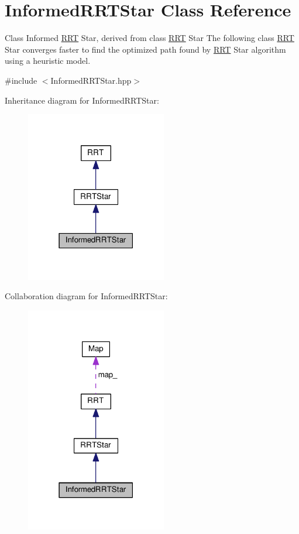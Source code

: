 \hypertarget{classInformedRRTStar}{}\section{Informed\+R\+R\+T\+Star Class Reference}
\label{classInformedRRTStar}


Class Informed \hyperlink{classRRT}{R\+RT} Star, derived from class \hyperlink{classRRT}{R\+RT} Star The following class \hyperlink{classRRT}{R\+RT} Star converges faster to find the optimized path found by \hyperlink{classRRT}{R\+RT} Star algorithm using a heuristic model.  




{\ttfamily \#include $<$Informed\+R\+R\+T\+Star.\+hpp$>$}



Inheritance diagram for Informed\+R\+R\+T\+Star\+:
\nopagebreak
\begin{figure}[H]
\begin{center}
\leavevmode
\includegraphics[width=174pt]{classInformedRRTStar__inherit__graph}
\end{center}
\end{figure}


Collaboration diagram for Informed\+R\+R\+T\+Star\+:
\nopagebreak
\begin{figure}[H]
\begin{center}
\leavevmode
\includegraphics[width=174pt]{classInformedRRTStar__coll__graph}
\end{center}
\end{figure}
